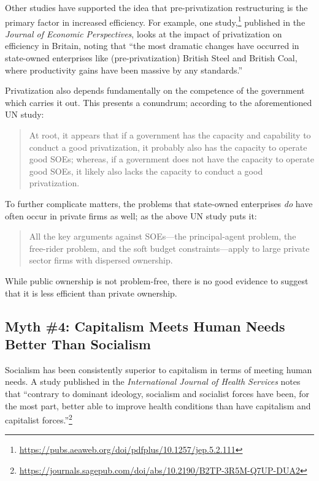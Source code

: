 Other studies have supported the idea that pre-privatization restructuring is the primary factor in increased efficiency.
For example, one study,\footnote{\href{https://pubs.aeaweb.org/doi/pdfplus/10.1257/jep.5.2.111}{https://pubs.aeaweb.org/doi/pdfplus/10.1257/jep.5.2.111}} published in the \textit{Journal of Economic Perspectives}, looks at the impact of privatization on efficiency in Britain, noting that ``the most dramatic changes have occurred in state-owned enterprises like (pre-privatization) British Steel and British Coal, where productivity gains have been massive by any standards.''

Privatization also depends fundamentally on the competence of the government which carries it out.
This presents a conundrum; according to the aforementioned UN study:
\begin{quote}
At root, it appears that if a government has the capacity and capability to conduct a good privatization, it probably also has the capacity to operate good SOEs; whereas, if a government does not have the capacity to operate good SOEs, it likely also lacks the capacity to conduct a good privatization.
\end{quote}
To further complicate matters, the problems that state-owned enterprises \emph{do} have often occur in private firms as well; as the above UN study puts it:
\begin{quote}
All the key arguments against SOEs---the principal-agent problem, the free-rider problem, and the soft budget constraints---apply to large private sector firms with dispersed ownership.
\end{quote}
While public ownership is not problem-free, there is no good evidence to suggest that it is less efficient than private ownership.

\subsection*{Myth \#4: Capitalism Meets Human Needs Better Than Socialism}

Socialism has been consistently superior to capitalism in terms of meeting human needs.
A study published in the \textit{International Journal of Health Services} notes that ``contrary to dominant ideology, socialism and socialist forces have been, for the most part, better able to improve health conditions than have capitalism and capitalist forces.''\footnote{\href{https://journals.sagepub.com/doi/abs/10.2190/B2TP-3R5M-Q7UP-DUA2}{https://journals.sagepub.com/doi/abs/10.2190/B2TP-3R5M-Q7UP-DUA2}}

